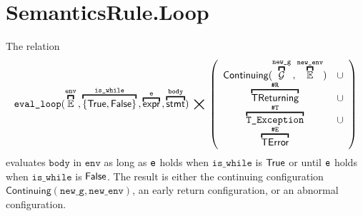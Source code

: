 \documentclass{book}
\newcommand\overname[2]{\overbracket{#1}^{#2}}
\newcommand\XGraphs[0]{\mathcal{G}}
\newcommand\aslrel[0]{\bigtimes}
\newcommand\aslsep[0]{\mathbf{,}}
\newcommand\ReturningConfig[0]{\texttt{\#R}}
\newcommand\ThrowingConfig[0]{\texttt{\#T}}
\newcommand\ErrorConfig[0]{\texttt{\#E}}
\newcommand\TError[0]{\textsf{TError}}
\newcommand\TReturning[0]{\textsf{TReturning}}
\newcommand\evalloop[1]{\texttt{eval\_loop}(#1)}
\newcommand\Continuing[0]{\textsf{Continuing}}
\newcommand\newenv[0]{\texttt{new\_env}}
\newcommand\env[0]{\texttt{env}}
\newcommand\newg[0]{\texttt{new\_g}}
\newcommand\vbody[0]{\texttt{body}}
\newcommand\iswhile[0]{\texttt{is\_while}}
\begin{document}
\section{SemanticsRule.Loop \label{sec:SemanticsRule.Loop}}
The relation
\[
  \evalloop{\overname{\envs}{\env} \aslsep \overname{\{\True,\False\}}{\iswhile} \aslsep \overname{\expr}{\ve} \aslsep \overname{\stmt}{\vbody}}
  \;\aslrel\;
  \left(
    \begin{array}{cl}
      \Continuing(\overname{\XGraphs}{\newg} \aslsep \overname{\envs}{\newenv}) & \cup \\
      \overname{\TReturning}{\ReturningConfig} & \cup \\
      \overname{\TException}{\ThrowingConfig} & \cup \\
      \overname{\TError}{\ErrorConfig} &
    \end{array}
  \right)
\]
evaluates $\vbody$ in $\env$ as long as $\texttt{e}$ holds when $\iswhile$ is $\textsf{True}$
or until $\texttt{e}$ holds when $\iswhile$ is $\textsf{False}$.
The result is either the continuing configuration $\Continuing(\newg,\newenv)$,
an early return configuration, or an abnormal configuration.
\end{document}
